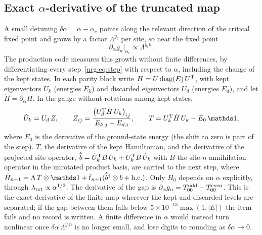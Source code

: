 \subsection{Exact \texorpdfstring{$\alpha$}{alpha}-derivative of the truncated map}\label{nrg:sec:tangent}
A small detuning $\delta\alpha=\alpha-\alpha_c$ points along the relevant direction of the critical fixed point and grows by a
factor $\Lambda^{y_t}$ per site, so near the fixed point
\begin{equation}
\partial_\alpha g_n\big|_{\alpha_c}\propto\Lambda^{y_tn}.\label{nrg:eq:growth}
\end{equation}
The production code measures this growth without finite differences, by differentiating every step~\eqref{nrg:eq:step} with respect to
$\alpha$, including the change of the kept states. In each parity block write $H=U\,{\rm diag}(E)\,U^{\rm T}$, with kept
eigenvectors $U_k$ (energies $E_k$) and discarded eigenvectors $U_d$ (energies $E_d$), and let $\dot H=\partial_\alpha H$. In the
gauge without rotations among kept states,
\begin{equation}
\dot U_k=U_d\,Z,\qquad Z_{ij}=\frac{\big(U_d^{\rm T}\dot H\,U_k\big)_{ij}}{E_{k,j}-E_{d,i}},\qquad
T=U_k^{\rm T}\dot H\,U_k-\dot E_0\,\one,
\label{nrg:eq:tangent}
\end{equation}
where $\dot E_0$ is the derivative of the ground-state energy (the shift to zero is part of the step). $T$, the derivative of the kept
Hamiltonian, and the derivative of the projected site operator, $\dot{\bar b}=\dot U_k^{\rm T}B\,U_k+U_k^{\rm T}B\,\dot U_k$ with $B$
the site-$n$ annihilation operator in the unrotated product basis, are carried to the next step, where
$\dot H_{n+1}=\Lambda\,T\otimes\one+\bar t_{n+1}(\dot{\bar b}^\dagger\otimes b+{\rm h.c.})$. Only $H_0$ depends on $\alpha$
explicitly, through $\lambda_{\rm tot}\propto\alpha^{1/2}$. The derivative of the gap is $\partial_\alpha g_n=T^{\rm odd}_{00}-T^{\rm
even}_{00}$. This is the exact derivative of the finite map wherever the kept and discarded levels are separated; if the gap between
them falls below $5\times10^{-13}\max(1,|E|)$ the item fails and no record is written. A finite difference in $\alpha$ would instead
turn nonlinear once $\delta\alpha\,\Lambda^{y_tn}$ is no longer small, and lose digits to rounding as $\delta\alpha\to0$.

